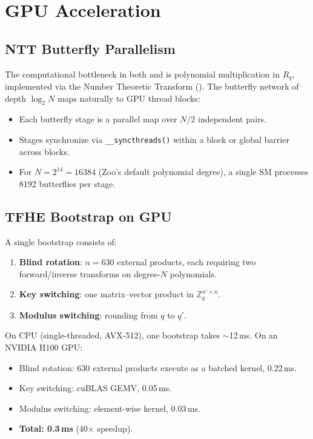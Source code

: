 \section{GPU Acceleration}

\label{sec:gpu}

\subsection{NTT Butterfly Parallelism}

The computational bottleneck in both \TFHE{} and \CKKS{} is polynomial multiplication in $R_q$, implemented via the Number Theoretic Transform (\NTT{}). The \NTT{} butterfly network of depth $\log_2 N$ maps naturally to GPU thread blocks:

\begin{itemize}
  \item Each butterfly stage is a parallel map over $N/2$ independent pairs.
  \item Stages synchronize via \texttt{\_\_syncthreads()} within a block or global barrier across blocks.
  \item For $N = 2^{14} = 16384$ (Zoo's default polynomial degree), a single SM processes 8192 butterflies per stage.
\end{itemize}

\subsection{TFHE Bootstrap on GPU}

A single \TFHE{} bootstrap consists of:

\begin{enumerate}
  \item \textbf{Blind rotation}: $n = 630$ external products, each requiring two \NTT{} forward/inverse transforms on degree-$N$ polynomials.
  \item \textbf{Key switching}: one matrix--vector product in $\mathbb{Z}_q^{n' \times n}$.
  \item \textbf{Modulus switching}: rounding from $q$ to $q'$.
\end{enumerate}

On CPU (single-threaded, AVX-512), one bootstrap takes $\sim$12\,ms. On an NVIDIA H100 GPU:

\begin{itemize}
  \item Blind rotation: 630 external products execute as a batched \NTT{} kernel, 0.22\,ms.
  \item Key switching: cuBLAS GEMV, 0.05\,ms.
  \item Modulus switching: element-wise kernel, 0.03\,ms.
  \item \textbf{Total: 0.3\,ms} (40$\times$ speedup).
\end{itemize}

